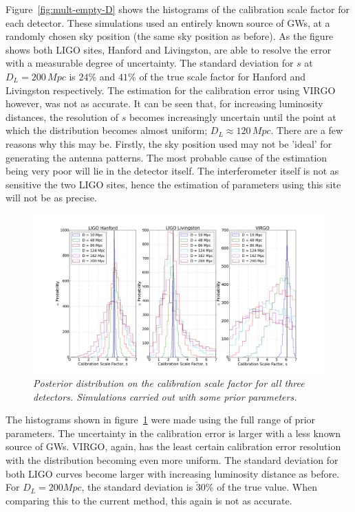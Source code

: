 \documentclass{jpconf}
\begin{document}
Figure~\ref{fig:mult-empty-D} shows the histograms of the calibration scale factor for each detector. These simulations used an entirely known source of GWs, at a randomly chosen sky position (the same sky position as before). As the figure shows both LIGO sites, Hanford and Livingston, are able to resolve the error with a measurable degree of uncertainty. The standard deviation for $s$ at $D_{L}=200\,Mpc$ is $24\%$ and $41\%$ of the true scale factor for Hanford and Livingston respectively. The estimation for the calibration error using VIRGO however, was not as accurate. It can be seen that, for increasing luminosity distances, the resolution of $s$ becomes increasingly uncertain until the point at which the distribution becomes almost uniform; $D_{L} \approx 120\,Mpc$. There are a few reasons why this may be. Firstly, the sky position used may not be 'ideal' for generating the antenna patterns. The most probable cause of the estimation being very poor will lie in the detector itself. The interferometer itself is not as sensitive the two LIGO sites, hence the estimation of parameters using this site will not be as precise.

\begin{figure}[h]
  \centering
  \includegraphics[width = \textwidth]{MD_non_empty_D10_200}
  \captionsetup{justification=centering}
  \caption{\textit{Posterior distribution on the calibration scale factor for all three detectors. Simulations carried out with some prior parameters. } }
  \label{fig:mult-non-D}
\end{figure}


The histograms shown in figure~\ref{fig:mult-non-D} were made using the full range of prior parameters. The uncertainty in the calibration error is larger with a less known source of GWs. VIRGO, again, has the least certain calibration error resolution with the distribution becoming even more uniform. The standard deviation for both LIGO curves become larger with increasing luminosity distance as before. For $D_{L} = 200Mpc$,  the standard deviation is $\tilde 30\%$ of the true value. When comparing this to the current method, this again is not as accurate. 
\end{document}
